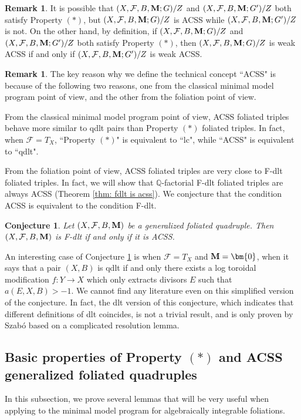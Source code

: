 \documentclass[11pt]{amsart}
\numberwithin{equation}{section}
\newcommand{\Mm}{{\bf{M}}}
\newcommand{\Qq}{\mathbb{Q}}
\newcommand{\Ff}{\mathcal{F}}
\newtheorem{conj}[thm]{Conjecture}
\theoremstyle{definition}
\theoremstyle{definition}
\newtheorem{rem}[thm]{Remark}
\theoremstyle{definition}
\begin{document}
\begin{rem}
It is possible that $(X,\Ff,B,\Mm;G)/Z$ and $(X,\Ff,B,\Mm;G')/Z$ both satisfy Property $(*)$, but $(X,\Ff,B,\Mm;G)/Z$ is ACSS while $(X,\Ff,B,\Mm;G')/Z$ is not. On the other hand, by definition, if $(X,\Ff,B,\Mm;G)/Z$ and $(X,\Ff,B,\Mm;G')/Z$ both satisfy Property $(*)$, then $(X,\Ff,B,\Mm;G)/Z$ is weak ACSS if and only if $(X,\Ff,B,\Mm;G')/Z$ is weak ACSS.
\end{rem}

\begin{rem}
    The key reason why we define the technical concept ``ACSS" is because of the following two reasons, one from the classical minimal model program point of view, and the other from the foliation point of view.
    
    From the classical minimal model program point of view, ACSS foliated triples behave more similar to qdlt pairs than Property $(*)$ foliated triples. In fact, when $\Ff=T_X$, ``Property $(*)$" is equivalent to ``lc", while ``ACSS" is equivalent to ``qdlt".
    
    From the foliation point of view, ACSS foliated triples are very close to F-dlt foliated triples. In fact, we will show that $\Qq$-factorial F-dlt foliated triples are always ACSS (Theorem \ref{thm: fdlt is acss}). We conjecture that the condition ACSS is equivalent to the condition F-dlt.
\end{rem}

\begin{conj}\label{conj: fdlt equivalent to acss}
    Let $(X,\Ff,B,\Mm)$ be a generalized foliated quadruple. Then $(X,\Ff,B,\Mm)$ is F-dlt if and only if it is ACSS.
\end{conj}
An interesting case of Conjecture \ref{conj: fdlt equivalent to acss} is when $\Ff=T_X$ and $\Mm=\bm{0}$, when it says that a pair $(X,B)$ is qdlt if and only there exists a log toroidal modification $f: Y\rightarrow X$ which only extracts divisors $E$ such that $a(E,X,B)>-1$. We cannot find any literature even on this simplified version of the conjecture. In fact, the dlt version of this conjecture, which indicates that different definitions of dlt coincides, is not a trivial result, and is only proven by Szab\'o \cite{Sza94} based on a complicated resolution lemma.



\subsection{Basic properties of Property \texorpdfstring{$(*)$}{} and ACSS generalized foliated quadruples} In this subsection, we prove several lemmas that will be very useful when applying to the minimal model program for algebraically integrable foliations.
\end{document}

